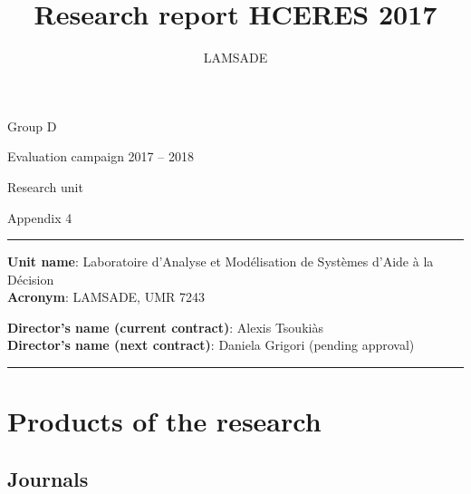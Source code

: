 \documentclass[version=last, pagesize, twoside=semi, DIV=calc, 12pt, a4paper, french, english, bibliography=totoc]{scrartcl}
\begin{document}
\title{Research report HCERES 2017}
\author{LAMSADE}

{%
	\centering%
		\colorbox{redh}{%
			\begin{minipage}{12.75cm}
				\begin{center}
					\color{white}
					\Large \sffamily%
						\vspace{1em}
						Group D\par
						Evaluation campaign 2017 – 2018\par
						\vspace{1em}
						Research unit\par
						\vspace{1em}
						Appendix 4
				\end{center}
			\end{minipage}%
		}
	\par
}

\vspace{2em}
\noindent\textcolor{redh}{\rule{\columnwidth}{1pt}}\par

\noindent
\textbf{Unit name}: Laboratoire d'Analyse et Modélisation de Systèmes d'Aide à la Décision \\
\textbf{Acronym}: LAMSADE, UMR 7243

\vspace{1em}

\noindent
\textbf{Director's name (current contract)}: Alexis Tsoukiàs \\
\textbf{Director's name (next contract)}: Daniela Grigori (pending approval)\\
\noindent\textcolor{redh}{\rule{\columnwidth}{1pt}}\par

\section{Products of the research}
\subsection{Journals}
\end{document}
